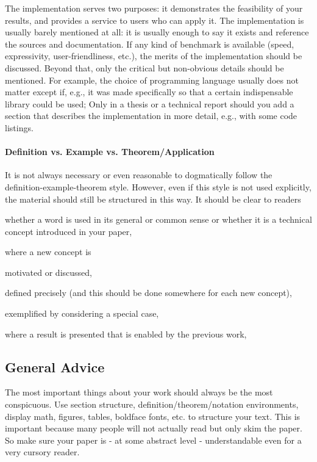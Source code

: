 \documentclass[12pt]{article}
\begin{document}
The implementation serves two purposes: it demonstrates the feasibility of your results, and provides a service to users who can apply it.
The implementation is usually barely mentioned at all: it is usually enough to say it exists and reference the sources and documentation.
If any kind of benchmark is available (speed, expressivity, user-friendliness, etc.), the merits of the implementation should be discussed.
Beyond that, only the critical but non-obvious details should be mentioned.
For example, the choice of programming language usually does not matter except if, e.g., it was made specifically so that a certain indispensable library could be used; 
Only in a thesis or a technical report should you add a section that describes the implementation in more detail, e.g., with some code listings.

\paragraph{Definition vs. Example vs. Theorem/Application}
It is not always necessary or even reasonable to dogmatically follow the definition-example-theorem style.
However, even if this style is not used explicitly, the material should still be structured in this way.
It should be clear to readers
\begin{compactitem}
 \item whether a word is used in its general or common sense or whether it is a technical concept introduced in your paper,
 \item where a new concept is
  \begin{compactitem}
    \item motivated or discussed,
    \item defined precisely (and this should be done somewhere for each new concept),
    \item exemplified by considering a special case,
  \end{compactitem}
 \item where a result is presented that is enabled by the previous work,
\end{compactitem}

\subsection{General Advice}

The most important things about your work should always be the most conspicuous.
Use section structure, definition/theorem/notation environments, display math, figures, tables, boldface fonts, etc. to structure your text.
This is important because many people will not actually read but only skim the paper.
So make sure your paper is - at some abstract level - understandable even for a very cursory reader.
\medskip
\end{document}
